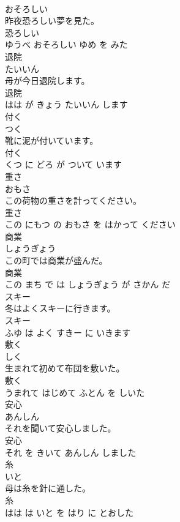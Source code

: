 \documentclass[8pt]{extreport}
\begin{document}
\begin{CJK}{UTF8}{min}
\\	おそろしい			
\\	昨夜恐ろしい夢を見た。	
\\	恐ろしい 
\\	ゆうべ おそろしい ゆめ を みた			
\\	退院	
\\	たいいん			
\\	母が今日退院します。	
\\	退院 
\\	はは が きょう たいいん します			
\\	付く	
\\	つく			
\\	靴に泥が付いています。	
\\	付く 
\\	くつ に どろ が ついて います			
\\	重さ	
\\	おもさ			
\\	この荷物の重さを計ってください。	
\\	重さ 
\\	この にもつ の おもさ を はかって ください			
\\	商業	
\\	しょうぎょう			
\\	この町では商業が盛んだ。	
\\	商業 
\\	この まち で は しょうぎょう が さかん だ			
\\	スキー	
\\	冬はよくスキーに行きます。	
\\	スキー 
\\	ふゆ は よく すきー に いきます			
\\	敷く	
\\	しく			
\\	生まれて初めて布団を敷いた。	
\\	敷く 
\\	うまれて はじめて ふとん を しいた			
\\	安心	
\\	あんしん			
\\	それを聞いて安心しました。	
\\	安心 
\\	それ を きいて あんしん しました			
\\	糸	
\\	いと			
\\	母は糸を針に通した。	
\\	糸 
\\	はは は いと を はり に とおした			

\end{CJK}
\end{document}
